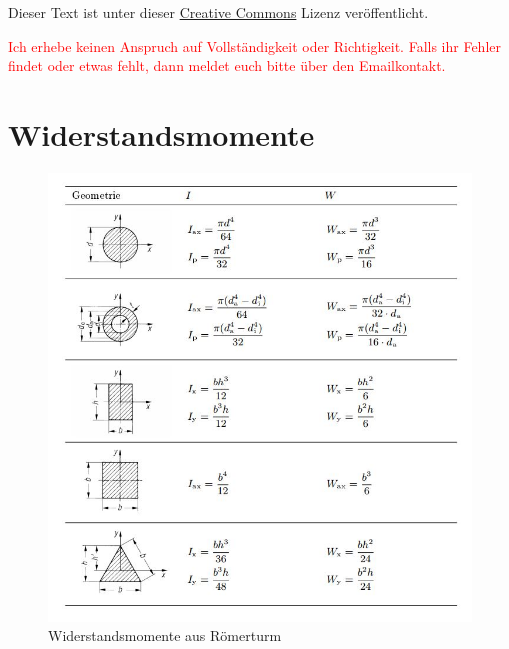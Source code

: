 




\maketitle

Dieser Text ist unter dieser \href{http://creativecommons.org/licenses/by-nc-sa/4.0/}{Creative Commons} Lizenz veröffentlicht.

\textcolor{red}{Ich erhebe keinen Anspruch auf Vollständigkeit oder Richtigkeit. Falls ihr Fehler findet oder etwas fehlt, dann meldet euch bitte über den Emailkontakt.}


\tableofcontents


\newpage

\section{Widerstandsmomente}

\begin{figure}[h]
	\centering
	\includegraphics[scale=0.9]{Widerstandsmomente.jpg}
	\caption{Widerstandsmomente aus Römerturm}
\end{figure}


